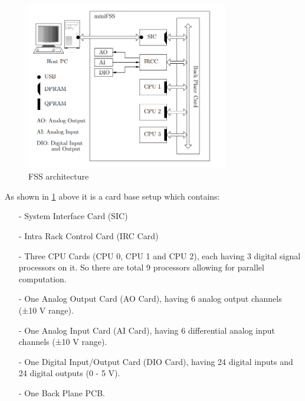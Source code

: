 \begin{figure}[th]
\centering
\includegraphics[width=250pt]{fig/fss_arch2.png}
\caption{FSS architecture}
\label{fig:fss_arch}
\end{figure}
As shown in \ref{fig:fss_arch} above it is a card base setup which contains:
\begin{itemize}
\item[-] System Interface Card (SIC)
\item[-] Intra Rack Control Card (IRC Card)
\item[-] Three CPU Cards (CPU 0, CPU 1 and CPU 2), each having 3 digital signal processors on it. So there are total 9 processors allowing for parallel computation.
\item[-] One Analog Output Card (AO Card), having 6 analog output channels (±10 V range).
\item[-]One Analog Input Card (AI Card), having 6 differential analog input channels (±10 V range).
\item[-] One Digital Input/Output Card (DIO Card), having 24 digital inputs and 24 digital outputs (0 - 5 V).
\item[-] One Back Plane PCB.
\end{itemize}


